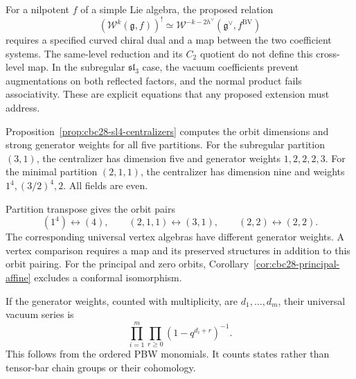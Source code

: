 \begin{remark}
For a nilpotent $f$ of a simple Lie algebra, the proposed relation
\[
 (\mathcal W^k(\mathfrak g,f))^!\simeq
 \mathcal W^{-k-2h^\vee}(\mathfrak g^\vee,f^{\mathrm{BV}})
\]
requires a specified curved chiral dual and a map between the two coefficient systems.
The same-level reduction and its $C_2$ quotient do not define this cross-level map.
In the subregular $\mathfrak{sl}_3$ case, the vacuum coefficients prevent augmentations on both reflected factors, and the normal product fails associativity.
These are explicit equations that any proposed extension must address.
\end{remark}

\begin{computation}
\label{comp:sl4-ds-hierarchy}
Proposition~\ref{prop:cbc28-sl4-centralizers} computes the orbit dimensions and strong generator weights for all five partitions.
For the subregular partition $(3,1)$, the centralizer has dimension five and generator weights $1,2,2,2,3$.
For the minimal partition $(2,1,1)$, the centralizer has dimension nine and weights $1^4,(3/2)^4,2$.
All fields are even.

Partition transpose gives the orbit pairs
\[
 (1^4)\longleftrightarrow(4),\qquad
 (2,1,1)\longleftrightarrow(3,1),\qquad
 (2,2)\longleftrightarrow(2,2).
\]
The corresponding universal vertex algebras have different generator weights.
A vertex comparison requires a map and its preserved structures in addition to this orbit pairing.
For the principal and zero orbits, Corollary~\ref{cor:cbc28-principal-affine} excludes a conformal isomorphism.

If the generator weights, counted with multiplicity, are $d_1,\ldots,d_m$, their universal vacuum series is
\[
 \prod_{i=1}^m\prod_{r\geq0}(1-q^{d_i+r})^{-1}.
\]
This follows from the ordered PBW monomials.
It counts states rather than tensor-bar chain groups or their cohomology.
\end{computation}
